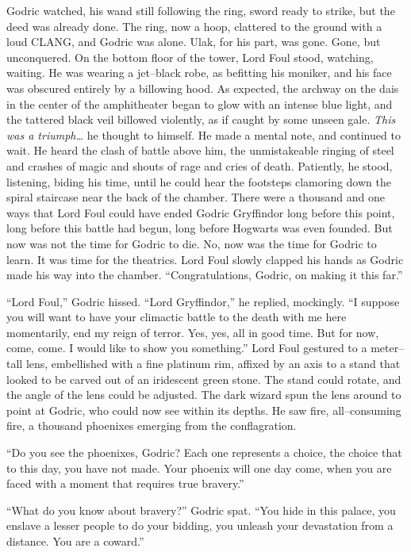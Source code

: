 Godric watched, his wand still following the ring, sword ready to strike, but the deed was already done. The ring, now a hoop, clattered to the ground with a loud CLANG, and Godric was alone.
\SomeVSpace
Ulak, for his part, was gone. Gone, but unconquered.
\simpleline
On the bottom floor of the tower, Lord Foul stood, watching, waiting. He was wearing a jet\mbox{--}black robe, as befitting his moniker, and his face was obscured entirely by a billowing hood. As expected, the archway on the dais in the center of the amphitheater began to glow with an intense blue light, and the tattered black veil billowed violently, as if caught by some unseen gale.
\SmallVSpace
\emph{This was a triumph…} he thought to himself. He made a mental note, and continued to wait. He heard the clash of battle above him, the unmistakeable ringing of steel and crashes of magic and shouts of rage and cries of death. Patiently, he stood, listening, biding his time, until he could hear the footsteps clamoring down the spiral staircase near the back of the chamber.
\SmallVSpace
There were a thousand and one ways that Lord Foul could have ended Godric Gryffindor long before this point, long before this battle had begun, long before Hogwarts was even founded. But now was not the time for Godric to die. No, now was the time for Godric to learn. It was time for the theatrics.
\SomeVSpace
Lord Foul slowly clapped his hands as Godric made his way into the chamber.
\SmallVSpace
“Congratulations, Godric, on making it this far.”

“Lord Foul,” Godric hissed.
\SmallVSpace
“Lord Gryffindor,” he replied, mockingly. “I suppose you will want to have your climactic battle to the death with me here momentarily, end my reign of terror. Yes, yes, all in good time. But for now, come, come. I would like to show you something.”
\SmallVSpace
Lord Foul gestured to a meter\mbox{--}tall lens, embellished with a fine platinum rim, affixed by an axis to a stand that looked to be carved out of an iridescent green stone. The stand could rotate, and the angle of the lens could be adjusted. The dark wizard spun the lens around to point at Godric, who could now see within its depths. He saw fire, all\mbox{--}consuming fire, a thousand phoenixes emerging from the conflagration.

“Do you see the phoenixes, Godric? Each one represents a choice, the choice that to this day, you have not made. Your phoenix will one day come, when you are faced with a moment that requires true bravery.”

“What do you know about bravery?” Godric spat. “You hide in this palace, you enslave a lesser people to do your bidding, you unleash your devastation from a distance. You are a coward.”

